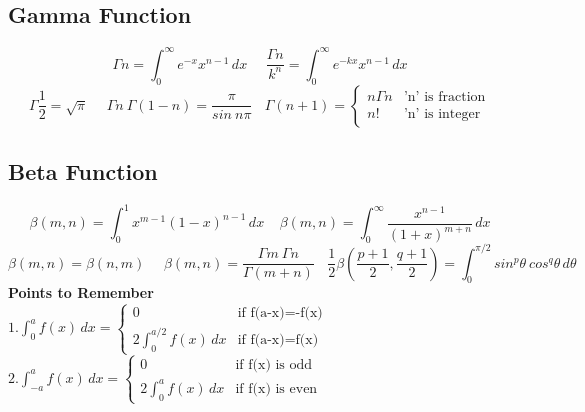 \subsection{Gamma Function}
\begin{fleqn}
\[\Gamma n = \int_{0}^{\infty} e^{-x} x^{n-1} \,dx\ \ \ \ \ \ 
\frac{\Gamma n}{k^n}=\int_{0}^{\infty} e^{-kx} x^{n-1} \,dx\]
\[\Gamma \frac{1}{2} = \sqrt{\pi}\ \ \ \ \ \ \Gamma n\ \Gamma(1-n)=\frac{\pi}{sin\ n\pi}
\ \ \ \  \Gamma (n+1) = 
\begin{cases}
    n\Gamma n & \text{'n' is fraction}\\
    n! & \text{'n' is integer}
\end{cases}
\]
\end{fleqn}

\subsection{Beta Function}
\begin{fleqn}
\[\beta(m,n)=\int_{0}^{1} x^{m-1} (1-x)^{n-1} \,dx\ \ \ \ \ 
\beta(m, n)=\int_{0}^{\infty}\frac{x^{n-1}}{(1+x)^{m+n}} \,dx\]
\[\beta(m,n)=\beta(n,m)\ \ \ \ \ \ \beta(m,n)=\frac{\Gamma m\ \Gamma n}{\Gamma (m+n)}\ \ \ \
\frac{1}{2}\beta\left(\frac{p+1}{2}, \frac{q+1}{2} \right)=\int_{0}^{\pi/2}sin^p\theta\ cos^q\theta \,d\theta\]
\textbf{Points to Remember}\\
\(1. \int_0^a f(x) \,dx = 
    \begin{cases}
    0 & \text{if f(a-x)=-f(x)}\\
    2\int_0^{a/2}f(x) \,dx & \text{if f(a-x)=f(x)}
    \end{cases}
\)            
\(2. \int_{-a}^a f(x) \,dx = 
    \begin{cases}
    0 & \text{if f(x) is odd}\\
    2\int_0^{a}f(x) \,dx & \text{if f(x) is even}
    \end{cases}
\)
\end{fleqn}

